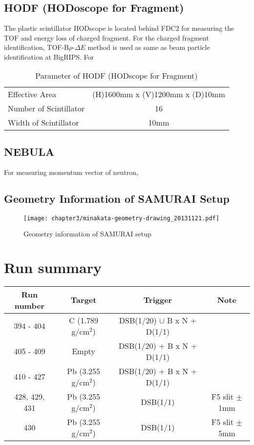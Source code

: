 \subsection{HODF (HODoscope for Fragment)}
The plastic scintillator HODscope is located behind FDC2 for measuring the TOF and energy loss of charged fragment. For the charged fragment identification, TOF-B$\rho$-$\Delta E$ method is used as same as beam particle identification at BigRIPS. For 
\begin{table}[h]
    \centering
    \begin{tabular}{l|c}
        \hline
        Effective Area & (H)1600mm x (V)1200mm x (D)10mm\\
        Number of Scintillator & 16 \\
        Width of Scintillator & 10mm \\
        \hline
    \end{tabular}
    \caption{Parameter of HODF (HODscope for Fragment) \cite{SAMURAI}}
\end{table}

\subsection{NEBULA}
For measuring momentum vector of neutron, 

\subsection{Geometry Information of SAMURAI Setup}

\begin{figure}
    \centering
    \texttt{[image: chapter3/minakata-geometry-drawing\_20131121.pdf]}
    \caption{Geometry information of SAMURAI setup}
\end{figure}

\section{Run summary}
\begin{center}
    \begin{tabular}[h]{c|ccc}
        \hline
        Run number& Target & Trigger & Note\\
        \hline
        394 - 404 &  C (1.789 g/cm${}^{2}$)  & DSB(1/20) $\cup$  B x N + D(1/1) &\\
        405 - 409 &  Empty  & DSB(1/20) + B x N + D(1/1) &\\
        410 - 427 &  Pb (3.255 g/cm${}^{2}$)  & DSB(1/20) + B x N + D(1/1) &\\
        428, 429, 431 & Pb (3.255 g/cm${}^{2}$)  & DSB(1/1) & F5 slit $\pm$1mm \\
        430 & Pb (3.255 g/cm${}^{2}$)  & DSB(1/1) & F5 slit $\pm$5mm \\
        \hline
    \end{tabular}
\end{center}

